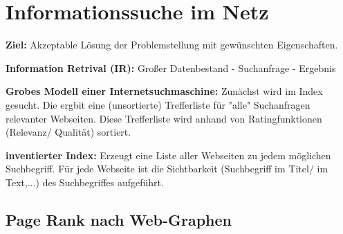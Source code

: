 
\chapter{Informationssuche im Netz}

\textbf{Ziel:} Akzeptable Lösung der Problemstellung mit gewünschten Eigenschaften.

\textbf{Information Retrival (IR):}  Großer Datenbestand - Suchanfrage - Ergebnis

\textbf{Grobes Modell einer Internetsuchmaschine:} Zunächst wird im Index gesucht. Die ergbit eine (unsortierte) Trefferliste für "alle" Suchanfragen relevanter Webseiten. Diese Trefferliste wird anhand von Ratingfunktionen (Relevanz/ Qualität) sortiert. 

\textbf{inventierter Index:} Erzeugt eine Liste aller Webseiten zu jedem möglichen Suchbegriff. Für jede Webseite ist die Sichtbarkeit (Suchbegriff im Titel/ im Text,...) des Suchbegriffes aufgeführt. 

\section{Page Rank nach Web-Graphen} 


